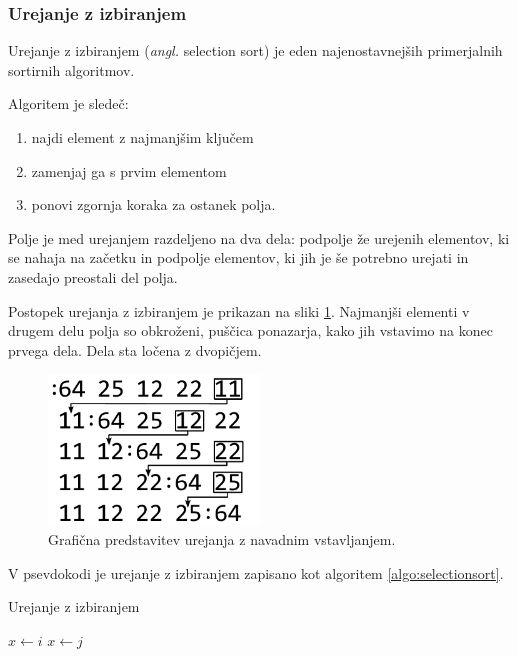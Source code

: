 \documentclass[a4paper,oneside,12pt]{article}
\begin{document}
\subsubsection{Urejanje z izbiranjem}
\label{chapter:selectionsort}
Urejanje z izbiranjem (\emph{angl.} selection sort) je eden najenostavnejših primerjalnih sortirnih
algoritmov.

Algoritem je sledeč:
\begin{enumerate}
  \item najdi element z najmanjšim ključem
  \item zamenjaj ga s prvim elementom
  \item ponovi zgornja koraka za ostanek polja.
\end{enumerate}

Polje je med urejanjem razdeljeno na dva dela: podpolje že urejenih elementov, ki se
nahaja na začetku in podpolje elementov, ki jih je še potrebno urejati in zasedajo
preostali del polja.

Postopek urejanja z izbiranjem je prikazan na sliki \ref{fig:selectionsortimage}.
Najmanjši elementi v drugem delu polja so obkroženi, puščica ponazarja, kako jih
vstavimo na konec prvega dela. Dela sta ločena z dvopičjem.

\begin{figure}[h]
    \begin{center}
        \includegraphics[height=40mm]{slike/selectionsort.pdf}
    \end{center}
    \vspace{-0.7cm}
    \caption[Urejanje z izbiranjem]{Grafična predstavitev urejanja z navadnim vstavljanjem.}
    \label{fig:selectionsortimage}
\end{figure}

V psevdokodi je urejanje z izbiranjem zapisano kot algoritem \ref{algo:selectionsort}.

\begin{algorithm}
  \caption{Urejanje z izbiranjem}\label{algo:selectionsort}
  \begin{algorithmic}[1]
            \State $x \gets i$
                    \State $x \gets j$
                \EndIf
            \EndFor
        \EndFor
    \EndFunction
  \end{algorithmic}
\end{algorithm}
\end{document}
